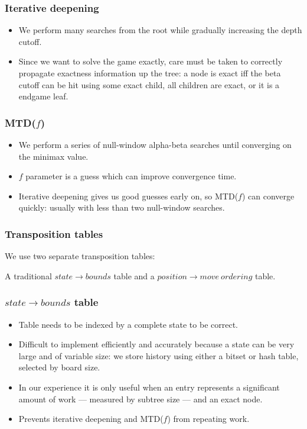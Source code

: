 \documentclass{beamer}
\begin{document}
    \begin{frame}
        \frametitle{Iterative deepening}
        \begin{itemize}
            \item We perform many searches from the root while gradually increasing the depth cutoff.
            \item Since we want to solve the game exactly, care must be taken to correctly propagate exactness
                information up the tree: a node is exact iff the beta cutoff can be hit using some exact child,
                all children are exact, or it is a endgame leaf.
        \end{itemize}
    \end{frame}

    \begin{frame}
        \frametitle{MTD($f$)}
        \begin{itemize}
            \item We perform a series of null-window alpha-beta searches until converging on the minimax value.
            \item $f$ parameter is a guess which can improve convergence time.
            \item Iterative deepening gives us good guesses early on, so MTD($f$) can converge quickly:
                usually with less than two null-window searches.
        \end{itemize}
    \end{frame}

    \begin{frame}
        \frametitle{Transposition tables}
        We use two separate transposition tables:

        A traditional $state \rightarrow bounds$ table and
            a $position \rightarrow move\ ordering$ table.
    \end{frame}

    \begin{frame}
        \frametitle{$state \rightarrow bounds$ table}
        \begin{itemize}
            \item Table needs to be indexed by a complete state to be correct.
            \item Difficult to implement efficiently and accurately because a state can be very
                large and of variable size: we store history using either a bitset or hash table, selected by
                board size.
            \item In our experience it is only useful when an entry represents a significant amount
                of work --- measured by subtree size --- and an exact node.
            \item Prevents iterative deepening and MTD($f$) from repeating work.
        \end{itemize}
    \end{frame}
\end{document}
